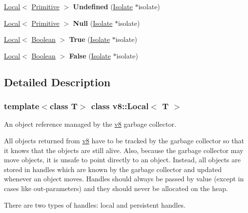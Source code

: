 \begin{DoxyCompactItemize}
\mbox{\hyperlink{classv8_1_1Local}{Local}}$<$ \mbox{\hyperlink{classv8_1_1Primitive}{Primitive}} $>$ {\bfseries Undefined} (\mbox{\hyperlink{classv8_1_1Isolate}{Isolate}} $\ast$isolate)
\item 
\mbox{\label{classv8_1_1Local_a6a29184b023bde58d4af2bba2d249a35}} 
\mbox{\hyperlink{classv8_1_1Local}{Local}}$<$ \mbox{\hyperlink{classv8_1_1Primitive}{Primitive}} $>$ {\bfseries Null} (\mbox{\hyperlink{classv8_1_1Isolate}{Isolate}} $\ast$isolate)
\item 
\mbox{\label{classv8_1_1Local_aa5944f05409b5572b14793eff33a7908}} 
\mbox{\hyperlink{classv8_1_1Local}{Local}}$<$ \mbox{\hyperlink{classv8_1_1Boolean}{Boolean}} $>$ {\bfseries True} (\mbox{\hyperlink{classv8_1_1Isolate}{Isolate}} $\ast$isolate)
\item 
\mbox{\label{classv8_1_1Local_ae8e414a3a8b3e1f2fa60c24e4dda0c4a}} 
\mbox{\hyperlink{classv8_1_1Local}{Local}}$<$ \mbox{\hyperlink{classv8_1_1Boolean}{Boolean}} $>$ {\bfseries False} (\mbox{\hyperlink{classv8_1_1Isolate}{Isolate}} $\ast$isolate)
\end{DoxyCompactItemize}


\subsection{Detailed Description}
\subsubsection*{template$<$class T$>$\newline
class v8\+::\+Local$<$ T $>$}

An object reference managed by the \mbox{\hyperlink{namespacev8}{v8}} garbage collector.

All objects returned from \mbox{\hyperlink{namespacev8}{v8}} have to be tracked by the garbage collector so that it knows that the objects are still alive. Also, because the garbage collector may move objects, it is unsafe to point directly to an object. Instead, all objects are stored in handles which are known by the garbage collector and updated whenever an object moves. Handles should always be passed by value (except in cases like out-\/parameters) and they should never be allocated on the heap.

There are two types of handles\+: local and persistent handles.

